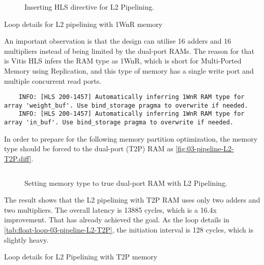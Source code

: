 \begin{figure}[ht!]
    \centering
    \inputminted{diff}{program/diff.L2}
    \caption{Inserting HLS directive for L2 Pipelining.}\label{fig:float-diff.L2}
\end{figure}

\begin{table}[ht!]
    \caption{Loop details for L2 pipelining with 1WnR memory}
    \label{tab:float-loop-03-pipeline-L2-1WnR}
    \centering
    
\end{table}

An important observation is that the design can utilise 16 adders and 16 multipliers instead of being limited by the dual-port RAMs.
The reason for that is Vitis HLS infers the RAM type as 1WnR, which is short for Multi-Ported Memory using Replication, and this type of memory has a single write port and multiple concurrent read ports.
\begin{verbatim}
    INFO: [HLS 200-1457] Automatically inferring 1WnR RAM type for array 'weight_buf'. Use bind_storage pragma to overwrite if needed.
    INFO: [HLS 200-1457] Automatically inferring 1WnR RAM type for array 'in_buf'. Use bind_storage pragma to overwrite if needed.
\end{verbatim}

In order to prepare for the following memory partition optimization, the memory type should be forced to the dual-port (T2P) RAM as \autoref{fig:03-pipeline-L2-T2P.diff}.
\begin{figure}[ht!]
    \centering
    \inputminted[firstline=3]{diff}{program/03-pipeline-L2-T2P.diff}
    \caption{Setting memory type to true dual-port RAM with L2 Pipelining.}\label{fig:03-pipeline-L2-T2P.diff}
\end{figure}
The result shows that the L2 pipelining with T2P RAM uses only two adders and two multipliers.
The overall latency is 13885 cycles, which is a 16.4x improvement.
That has already achieved the goal.
As the loop details in \autoref{tab:float-loop-03-pipeline-L2-T2P}, the initiation interval is 128 cycles, which is slightly heavy.

\begin{table}
    \caption{Loop details for L2 Pipelining with T2P memory}
    \label{tab:float-loop-03-pipeline-L2-T2P}
    \centering
    
\end{table}

